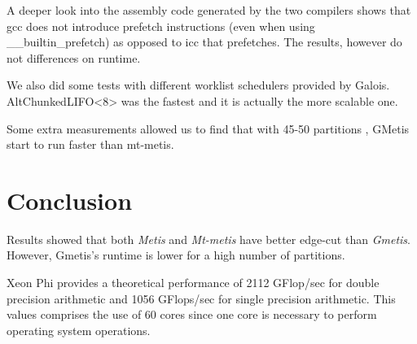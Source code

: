 \documentclass[abstract=on,9pt,twocolumn]{scrartcl}
\begin{document}
A deeper look into the assembly code generated by the two compilers
shows that gcc does not introduce prefetch instructions (even when using
\_\_builtin\_prefetch) as opposed to icc that prefetches. The results,
however do not differences on runtime.

We also did some tests with different worklist schedulers provided by
Galois. AltChunkedLIFO<8> was the fastest and it is actually the more
scalable one.




Some extra measurements allowed us to find that with 45-50 partitions
, GMetis start to run faster than mt-metis.





\section{Conclusion}
\label{sec:conc}
Results showed that both \textit{Metis} and \textit{Mt-metis} have
better edge-cut than \textit{Gmetis}. However, Gmetis's runtime is lower
for a high number of partitions.


Xeon Phi provides a theoretical performance of 2112 GFlop/sec for double
precision arithmetic and 1056 GFlops/sec for single precision
arithmetic. This values comprises the use of 60 cores since one core is
necessary to perform operating system operations.






\end{document}
